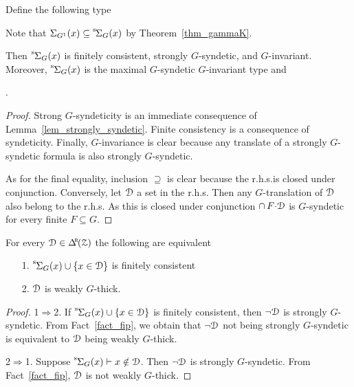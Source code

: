 Define the following type

\smallskip

Note that $\Sigma_{G^1}(x)\subseteq{\mathstrut}^{\rm s}\kern-.2ex\Sigma_G(x)$ by Theorem~\ref{thm_gammaK}.

\begin{corollary}\label{corol_str_gen}
  Then ${\mathstrut}^{\rm s}\kern-.1ex\Sigma_G(x)$ is finitely consistent, strongly $G$-syndetic, and $G$-invariant.
  Moreover, ${\mathstrut}^{\rm s}\kern-.1ex\Sigma_G(x)$ is the maximal $G$-syndetic $G$-invariant type and\medskip

  .

\end{corollary}

\begin{proof}
  Strong $G$-syndeticity is an immediate consequence of Lemma~\ref{lem_strongly_syndetic}.
  Finite consistency is a consequence of syndeticity.
  Finally, $G$-invariance is clear because any translate of a strongly $G$-syndetic formula is also strongly $G$-syndetic.

  As for the final equality, inclusion $\supseteq$ is clear because the r.h.s.\@ is closed under conjunction.
  Conversely, let $\EuScript D$ a set in the r.h.s.
  Then any $G$-translation of $\EuScript D$ also belong to the r.h.s.
  As this is closed under conjunction $\cap\,F{\cdot}\EuScript D$ is $G$-syndetic for every finite $F\subseteq G$. 
\end{proof}

\begin{proposition}\label{prop_q_w_pers}
  For every $\D\in\BDelta(\Z)$ the following are equivalent
  \begin{itemize}
    \item [1.] ${\mathstrut}^{\rm s}\kern-.1ex\Sigma_G(x)\cup\{x\in\EuScript D\}$ is finitely consistent
    \item [2.] $\EuScript D$ is weakly $G$-thick.
  \end{itemize}
\end{proposition}

\begin{proof}
  1$\Rightarrow$2. 
  If ${\mathstrut}^{\rm s}\kern-.1ex\Sigma_G(x)\cup\{x\in\EuScript D\}$ is finitely consistent, then $\neg\EuScript D$ is strongly $G$-syndetic.
  From Fact~\ref{fact_fip}, we obtain that $\neg\EuScript D$ not being strongly $G$-syndetic is equivalent to $\EuScript D$ being weakly $G$-thick.

  2$\Rightarrow$1.
  Suppose ${\mathstrut}^{\rm s}\kern-.1ex\Sigma_G(x)\vdash x\notin\EuScript D$.
  Then $\neg\EuScript D$ is strongly $G$-syndetic.
  From Fact~\ref{fact_fip}, $\EuScript D$ is not weakly $G$-thick.
\end{proof}

